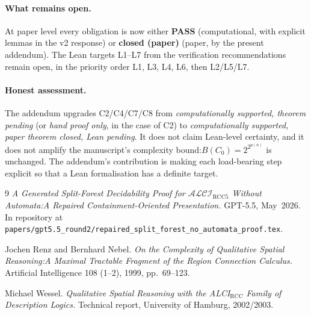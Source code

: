 \documentclass[11pt]{article}
\newcommand{\ALCIRCC}{\ensuremath{\mathcal{ALCI}_{\mathrm{RCC5}}}}
\newcommand{\PASS}{\textcolor{black!70!green}{\textbf{PASS}}}
\newcommand{\CLOSED}{\textcolor{black!70!green}{\textbf{closed (paper)}}}
\begin{document}
\paragraph{What remains open.}  At paper level every obligation is
now either \PASS{} (computational, with explicit lemmas in the v2
response) or \CLOSED{} (paper, by the present addendum).  The Lean
targets L1--L7 from the verification recommendations remain open,
in the priority order L1, L3, L4, L6, then L2/L5/L7.

\paragraph{Honest assessment.}  The addendum upgrades C2/C4/C7/C8
from \emph{computationally supported, theorem pending} (or
\emph{hand proof only}, in the case of C2) to
\emph{computationally supported, paper theorem closed, Lean
pending}.  It does not claim Lean-level certainty, and it does not
amplify the manuscript's complexity bound:\@ \(B(C_0) =
2^{2^{p(n)}}\) is unchanged.  The addendum's contribution is
making each load-bearing step explicit so that a Lean
formalisation has a definite target.

\begin{thebibliography}{9}
\emph{A Generated Split-Forest Decidability Proof for \(\ALCIRCC\)
Without Automata:\@ A Repaired Containment-Oriented Presentation.}
GPT-5.5, May~2026.  In repository at
\texttt{papers/gpt5.5\_round2/repaired\_split\_forest\_no\_automata\_proof.tex}.

Jochen Renz and Bernhard Nebel.
\emph{On the Complexity of Qualitative Spatial Reasoning:\@ A Maximal
Tractable Fragment of the Region Connection Calculus.}
Artificial Intelligence 108 (1--2), 1999, pp.~69--123.

Michael Wessel.
\emph{Qualitative Spatial Reasoning with the ALCI\(_{\mathrm{RCC}}\)
Family of Description Logics.}
Technical report, University of Hamburg, 2002/2003.
\end{thebibliography}
\end{document}
